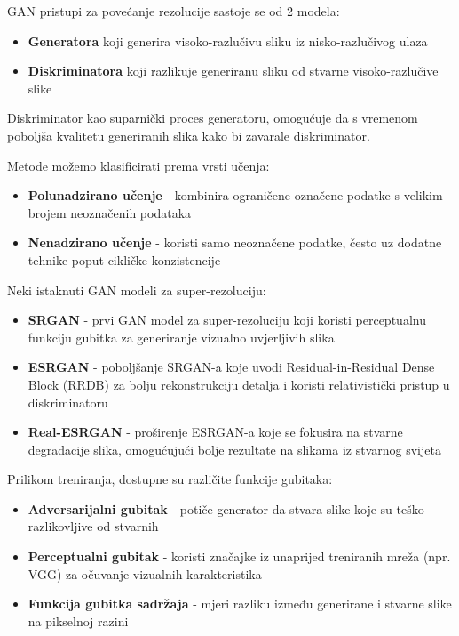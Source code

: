 \documentclass[times, utf8, seminar, numeric]{fer}
\begin{document}
		GAN pristupi za povećanje rezolucije sastoje se od 2 modela:
		\begin{itemize}
			\item \textbf{Generatora} koji generira visoko-razlučivu sliku iz nisko-razlučivog ulaza
			\item \textbf{Diskriminatora} koji razlikuje generiranu sliku od stvarne visoko-razlučive slike
		\end{itemize}
		Diskriminator kao suparnički proces generatoru, omogućuje da s vremenom poboljša kvalitetu generiranih slika kako bi zavarale diskriminator.
		
		Metode možemo klasificirati prema vrsti učenja:
		\begin{itemize}
			\item \textbf{Polunadzirano učenje} - kombinira ograničene označene podatke s velikim brojem neoznačenih podataka
			\item \textbf{Nenadzirano učenje} - koristi samo neoznačene podatke, često uz dodatne tehnike poput cikličke konzistencije
		\end{itemize}
		
		Neki istaknuti GAN modeli za super-rezoluciju:
		\begin{itemize}
			\item \textbf{SRGAN} -  prvi GAN model za super-rezoluciju koji koristi perceptualnu funkciju gubitka za generiranje vizualno uvjerljivih slika
			\item \textbf{ESRGAN} - poboljšanje SRGAN-a koje uvodi Residual-in-Residual Dense Block (RRDB) za bolju rekonstrukciju detalja i koristi relativistički pristup u diskriminatoru
			\item \textbf{Real-ESRGAN} - proširenje ESRGAN-a koje se fokusira na stvarne degradacije slika, omogućujući bolje rezultate na slikama iz stvarnog svijeta
		\end{itemize}
		
		
		Prilikom treniranja, dostupne su različite funkcije gubitaka:
		\begin{itemize}
			\item \textbf{Adversarijalni gubitak} - potiče generator da stvara slike koje su teško razlikovljive od stvarnih
			\item \textbf{Perceptualni gubitak} - koristi značajke iz unaprijed treniranih mreža (npr. VGG) za očuvanje vizualnih karakteristika
			\item \textbf{Funkcija gubitka sadržaja} - mjeri razliku između generirane i stvarne slike na pikselnoj razini
		\end{itemize}
		
\end{document}
